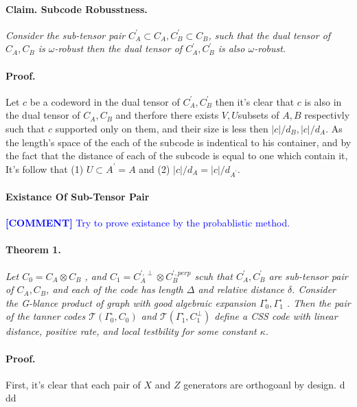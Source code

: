 \documentclass{article}
\newcommand{\commentt}[1]{\textcolor{blue}{ \textbf{[COMMENT]} #1}}
\newcommand{\ctt}[1]{\commentt{#1}}
\begin{document}
\begin{multicols*}{2}
 \paragraph{Claim. Subcode Robusstness.} \textit{ Consider the sub-tensor pair $C_{A}^{\prime}\subset C_{A}, C_{B}^{\prime}\subset C_{B}$, such that the dual tensor of $C_{A}, C_{B}$ is $\omega$-robust then the dual tensor of $C_{A}^{\prime}, C_{B}^{\prime}$ is also $\omega$-robust.} 
 \paragraph{Proof.} Let $c$ be a codeword in the dual tensor of $C_{A}^{\prime},C_{B}^{\prime}$ then it's clear that $c$ is also in the dual tensor of $C_{A}, C_{B}$ and therfore there exists $V,U$subsets of $A,B$ respectivly such that $c$ supported only on them, and their size is less then $|c|/d_{B}, |c|/d_{A}$. As the length's space of the each of the subcode is indentical to his container, and by the fact that the distance of each of the subcode is equal to one which contain it, It's follow that (1) $U \subset A^\prime = A $ and (2) $|c|/d_{A}=|c|/d_{A^\prime}$. 

 \paragraph{Existance Of Sub-Tensor Pair } \ctt{ Try to prove existance by the probablistic method.} 
 \paragraph{Theorem 1.} \textit{ Let $C_{0} = C_{A}\otimes C_{B}$ , and $C_{1} = C_{A}^{\prime, \perp} \otimes C_{B}^{\prime, perp}$ scuh that $C_{A}^\prime, C_{B}^\prime$ are sub-tensor pair of $C_{A},C_{B}$, and each of the code has length $\Delta$ and relative distance $\delta$. Consider the G-blance product of graph with good algebraic expansion $\Gamma^{\square}_{0},\Gamma^{\square}_{1}$ . Then the pair of the tanner codes $\mathcal{T}\left( \Gamma^{\square}_{0}, C_0 \right)$ and  $\mathcal{T}\left( \Gamma^{\square}_{1}, C_{1}^{\perp} \right)$ define a CSS code with linear distance, positive rate, and local testbility for some constant $\kappa$.} 

 \paragraph{Proof.} First, it's clear that each pair of $X$ and $Z$ generators are orthogoanl by design. d dd     
\end{multicols*}
\end{document}

